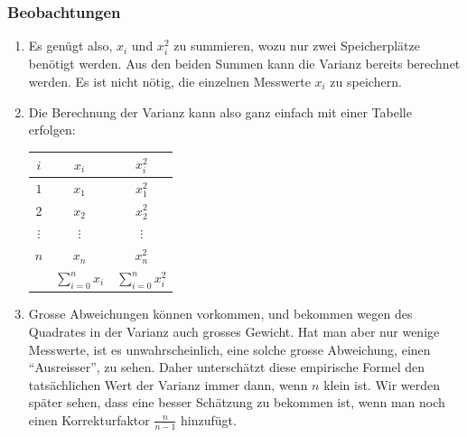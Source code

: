 \subsubsection{Beobachtungen}
\begin{enumerate}
\item
Es genügt also, $x_i$ und $x_i^2$ zu summieren, wozu nur zwei Speicherplätze
benötigt werden.
Aus den beiden Summen kann die Varianz bereits berechnet werden.
Es ist nicht nötig, die einzelnen Messwerte $x_i$ zu speichern.
\item
Die Berechnung der Varianz kann also ganz einfach mit einer Tabelle
erfolgen:
\begin{center}
\begin{tabular}{|c|c|c|}
\hline
$i$&$x_i$&$x_i^2$\\
\hline
$1$&$x_1$&$x_1^2$\\
$2$&$x_2$&$x_2^2$\\
$\vdots$&$\vdots$&$\vdots$\\
$n$&$x_n$&$x_n^2$\\
\hline
&$\sum_{i=0}^n x_i$&$\sum_{i=0}^n x_i^2$\\
\hline
\end{tabular}
\end{center}
\item
Grosse Abweichungen können vorkommen, und bekommen wegen des
Quadrates in der Varianz auch grosses Gewicht.
Hat man aber nur
wenige Messwerte, ist es unwahrscheinlich, eine solche grosse
Abweichung, einen ``Ausreisser'', zu sehen.
Daher unterschätzt
diese empirische Formel den tatsächlichen Wert der Varianz immer
dann, wenn $n$ klein ist.
Wir werden später sehen, dass eine
besser Schätzung zu bekommen ist, wenn man noch einen Korrekturfaktor
$\frac{n}{n-1}$ hinzufügt.
\end{enumerate}

